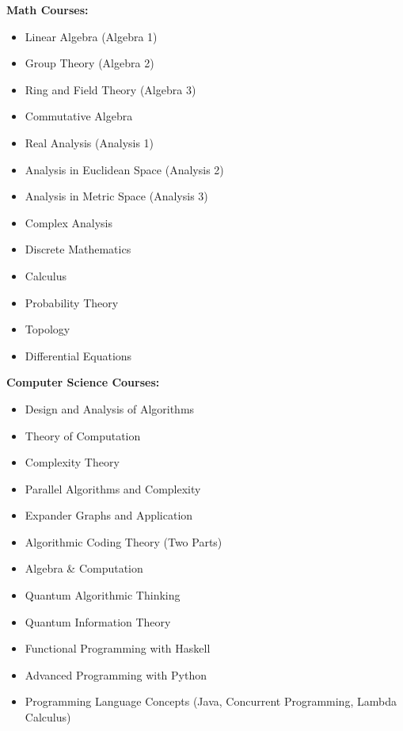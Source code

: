 \documentclass[a4paper,skipsamekey,11pt,english]{curve}
\begin{document}
\begin{itemize}
	      \begin{multicols}{2}
		      \textbf{Math Courses:}{}
		      \begin{itemize}
			      \item Linear Algebra (Algebra 1)
			      \item Group Theory (Algebra 2)
			      \item Ring and  Field Theory (Algebra 3)
			      \item Commutative Algebra
			      \item Real Analysis (Analysis 1)
			      \item Analysis in Euclidean Space (Analysis 2)
			      \columnbreak
			      \item Analysis in Metric Space (Analysis 3)
			      \item Complex Analysis
			      \item Discrete Mathematics
			      \item Calculus
			      \item Probability Theory
			      \item Topology
			      \item Differential Equations
		      \end{itemize}

		      \textbf{Computer Science Courses:}{}
		      \begin{itemize}
			      \item Design and Analysis of Algorithms
			      \item Theory of Computation
			      \item Complexity Theory
			      \item Parallel Algorithms and Complexity
			      \item Expander Graphs and Application
			      \item Algorithmic Coding Theory (Two Parts)
			      \item Algebra \& Computation
			      \item Quantum Algorithmic Thinking
			      \item Quantum Information Theory
			      \item Functional Programming with Haskell
			      \item Advanced Programming with Python
			      \item Programming Language Concepts (Java, Concurrent Programming, Lambda Calculus)
		      \end{itemize}
	      \end{multicols}
\end{itemize}
% 
\end{document}
